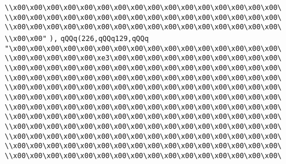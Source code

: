\verb|\\x00\x00\x00\x00\x00\x00\x00\x00\x00\x00\x00\x00\x00\x00\x00\x00\|\newline
\verb|\\x00\x00\x00\x00\x00\x00\x00\x00\x00\x00\x00\x00\x00\x00\x00\x00\|\newline
\verb|\\x00\x00\x00\x00\x00\x00\x00\x00\x00\x00\x00\x00\x00\x00\x00\x00\|\newline
\verb|\\x00\x00"|\newline
\verb|),|\newline
\verb|qQQq(226,qQQq129,qQQq|\newline
\verb|"\x00\x00\x00\x00\x00\x00\x00\x00\x00\x00\x00\x00\x00\x00\x00\x00\|\newline
\verb|\\x00\x00\x00\x00\x00\xe3\x00\x00\x00\x00\x00\x00\x00\x00\x00\x00\|\newline
\verb|\\x00\x00\x00\x00\x00\x00\x00\x00\x00\x00\x00\x00\x00\x00\x00\x00\|\newline
\verb|\\x00\x00\x00\x00\x00\x00\x00\x00\x00\x00\x00\x00\x00\x00\x00\x00\|\newline
\verb|\\x00\x00\x00\x00\x00\x00\x00\x00\x00\x00\x00\x00\x00\x00\x00\x00\|\newline
\verb|\\x00\x00\x00\x00\x00\x00\x00\x00\x00\x00\x00\x00\x00\x00\x00\x00\|\newline
\verb|\\x00\x00\x00\x00\x00\x00\x00\x00\x00\x00\x00\x00\x00\x00\x00\x00\|\newline
\verb|\\x00\x00\x00\x00\x00\x00\x00\x00\x00\x00\x00\x00\x00\x00\x00\x00\|\newline
\verb|\\x00\x00\x00\x00\x00\x00\x00\x00\x00\x00\x00\x00\x00\x00\x00\x00\|\newline
\verb|\\x00\x00\x00\x00\x00\x00\x00\x00\x00\x00\x00\x00\x00\x00\x00\x00\|\newline
\verb|\\x00\x00\x00\x00\x00\x00\x00\x00\x00\x00\x00\x00\x00\x00\x00\x00\|\newline
\verb|\\x00\x00\x00\x00\x00\x00\x00\x00\x00\x00\x00\x00\x00\x00\x00\x00\|\newline
